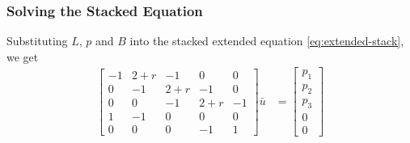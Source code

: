 \documentclass[11pt]{article}
\newcommand{\R}{\ensuremath{\mathbb{R}}}
\begin{document}
\subsubsection{Solving the Stacked Equation}

Substituting $L$, $p$ and $B$ into the stacked extended equation \cref{eq:extended-stack}, we get
\begin{align}
\begin{bmatrix}
	-1 & 2 + r & -1 & 0 & 0\\
	0 & -1 & 2+r & -1 & 0\\
	0 & 0 & -1 & 2+r & -1\\
	1 & -1 & 0 & 0 & 0\\
	0 & 0 & 0 & -1 & 1
\end{bmatrix} \bar{u} &= \begin{bmatrix} p_1 \\ p_2 \\ p_3 \\ 0 \\ 0\end{bmatrix}\label{eq:stacked-example-1}
\end{align}
	
\end{document}
